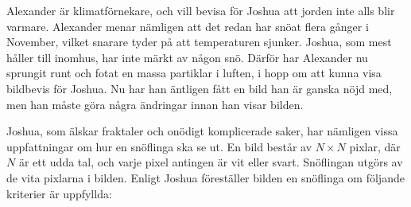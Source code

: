 \noindent
Alexander är klimatförnekare, och vill bevisa för Joshua att jorden inte alls blir varmare. 
Alexander menar nämligen att det redan har snöat flera gånger i November, 
vilket snarare tyder på att temperaturen sjunker. Joshua, som mest håller till inomhus, 
har inte märkt av någon snö. 
Därför har Alexander nu sprungit runt och fotat en massa partiklar i luften, 
i hopp om att kunna visa bildbevis för Joshua. 
Nu har han äntligen fått en bild han är ganska nöjd med, 
men han måste göra några ändringar innan han visar bilden. 

Joshua, som älskar fraktaler och onödigt komplicerade saker, har nämligen vissa uppfattningar om hur en snöflinga ska se ut.
En bild består av $N \times N$ pixlar, där $N$ är ett udda tal, och varje pixel antingen är vit eller svart.
Snöflingan utgörs av de vita pixlarna i bilden.
Enligt Joshua föreställer bilden en snöflinga om följande kriterier är uppfyllda:

